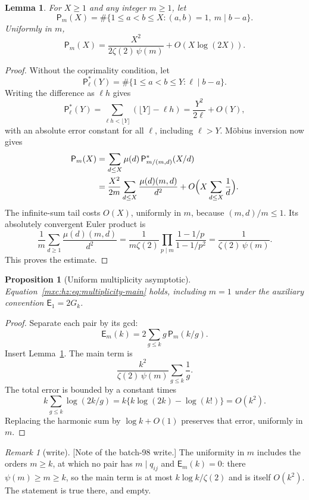 \documentclass[11pt]{article}
\numberwithin{equation}{section}
\newtheorem{proposition}[theorem]{Proposition}
\newtheorem{lemma}[theorem]{Lemma}
\theoremstyle{definition}
\theoremstyle{remark}
\newtheorem{remark}[theorem]{Remark}
\begin{document}
\begin{lemma}\label{mxc:hz:lem:primitive-congruence}
For $X\ge1$ and any integer $m\ge1$, let
\[
 \mathsf P_m(X)=\#\{1\le a<b\le X:(a,b)=1,\ m\mid b-a\}.
\]
Uniformly in $m$,
\begin{equation}\label{mxc:hz:eq:primitive-congruence}
 \mathsf P_m(X)=\frac{X^2}{2\zeta(2)\,\psi(m)}+O(X\log(2X)).
\end{equation}
\end{lemma}

\begin{proof}
Without the coprimality condition, let
\[
 \mathsf P^\ast_\ell(Y)=\#\{1\le a<b\le Y:\ell\mid b-a\}.
\]
Writing the difference as $\ell h$ gives
\[
 \mathsf P^\ast_\ell(Y)=\sum_{\ell h<\lfloor Y\rfloor}
             (\lfloor Y\rfloor-\ell h)
          =\frac{Y^2}{2\ell}+O(Y),
\]
with an absolute error constant for all $\ell$, including $\ell>Y$.
M\"obius inversion now gives
\begin{align*}
 \mathsf P_m(X)
 &=\sum_{d\le X}\mu(d)\,
       \mathsf P^\ast_{m/(m,d)}(X/d)\\
 &=\frac{X^2}{2m}
      \sum_{d\le X}\frac{\mu(d)(m,d)}{d^2}
      +O\Bigl(X\sum_{d\le X}\frac1d\Bigr).
\end{align*}
The infinite-sum tail costs $O(X)$, uniformly in $m$, because
$(m,d)/m\le1$. Its absolutely convergent Euler product is
\[
 \frac1m\sum_{d\ge1}\frac{\mu(d)(m,d)}{d^2}
 =\frac1{m\zeta(2)}
       \prod_{p\mid m}\frac{1-1/p}{1-1/p^2}
 =\frac1{\zeta(2)\,\psi(m)}.
\]
This proves the estimate.
\end{proof}

\begin{proposition}[Uniform multiplicity asymptotic]\label{mxc:hz:prop:multiplicity}
Equation~\eqref{mxc:hz:eq:multiplicity-main} holds, including $m=1$
under the auxiliary convention $\mathsf E_1=2G_k$.
\end{proposition}

\begin{proof}
Separate each pair by its gcd:
\[
 \mathsf E_m(k)=2\sum_{g\le k}g\,\mathsf P_m(k/g).
\]
Insert Lemma~\ref{mxc:hz:lem:primitive-congruence}. The main term is
\[
 \frac{k^2}{\zeta(2)\,\psi(m)}\sum_{g\le k}\frac1g.
\]
The total error is bounded by a constant times
\[
 k\sum_{g\le k}\log(2k/g)
 =k\{k\log(2k)-\log(k!)\}=O(k^2).
\]
Replacing the harmonic sum by $\log k+O(1)$ preserves that error,
uniformly in $m$.
\end{proof}

\begin{remark}[write]\label{mxc:hz:rem:large-m}
[Note of the batch-98 write.] The uniformity in $m$ includes the orders
$m\ge k$, at which no pair has $m\mid q_{ij}$ and $\mathsf E_m(k)=0$: there
$\psi(m)\ge m\ge k$, so the main term is at most $k\log k/\zeta(2)$ and is
itself $O(k^2)$. The statement is true there, and empty.
\end{remark}
\end{document}
